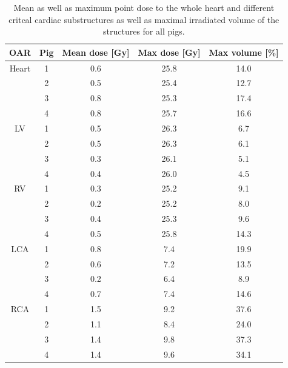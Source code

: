 \documentclass[type=dr, dr=rernat, accentcolor=tud7b,colorbacktitle, bigchapter, openright, twoside, 12pt ]{tudthesis}
\begin{document}
\begin{table}[htbp]
\centering
\caption{Mean as well as maximum point dose to the whole heart and different critcal cardiac substructures as well as maximal irradiated 
volume of the structures for all pigs.}
  \begin{tabular}{ |c||c||c|c|c|}
    \hline
    OAR & Pig & Mean dose [Gy] & Max dose [Gy] & Max volume [\%] \\ \hline \hline
Heart & 1 & 0.6 & 25.8 & 14.0 \\ 
 & 2 & 0.5 & 25.4 & 12.7 \\ 
 & 3 & 0.8 & 25.3 & 17.4 \\ 
 & 4 & 0.8 & 25.7 & 16.6 \\ 
\hline
LV & 1 & 0.5 & 26.3 & 6.7 \\ 
 & 2 & 0.5 & 26.3 & 6.1 \\ 
 & 3 & 0.3 & 26.1 & 5.1 \\ 
 & 4 & 0.4 & 26.0 & 4.5 \\ 
\hline
RV & 1 & 0.3 & 25.2 & 9.1 \\ 
 & 2 & 0.2 & 25.2 & 8.0 \\ 
 & 3 & 0.4 & 25.3 & 9.6 \\ 
 & 4 & 0.5 & 25.8 & 14.3 \\ 
\hline
LCA & 1 & 0.8 & 7.4 & 19.9 \\ 
 & 2 & 0.6 & 7.2 & 13.5 \\ 
 & 3 & 0.2 & 6.4 & 8.9 \\ 
 & 4 & 0.7 & 7.4 & 14.6 \\ 
\hline
RCA & 1 & 1.5 & 9.2 & 37.6 \\ 
 & 2 & 1.1 & 8.4 & 24.0 \\ 
 & 3 & 1.4 & 9.8 & 37.3 \\ 
 & 4 & 1.4 & 9.6 & 34.1 \\ 
\hline
  \end{tabular}
  \label{DV_OAR:pig}
\end{table}
\end{document}
